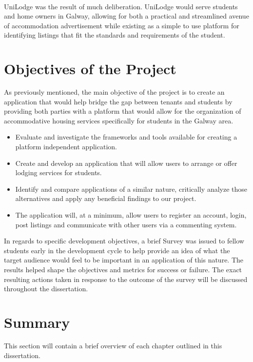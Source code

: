 \paragraph{}
UniLodge was the result of much deliberation. UniLodge would serve students and home owners in Galway, allowing for both a practical and streamlined avenue of accommodation advertisement while existing as a simple to use platform for identifying listings that fit the standards and requirements of the student. 

\section{Objectives of the Project}
As previously mentioned, the main objective of the project is to create an application that would help bridge the gap between tenants and students by providing both parties with a platform that would allow for the organization of accommodative housing services specifically for students in the Galway area.

\begin{itemize}
    \item Evaluate and investigate the frameworks and tools available for creating a platform independent application.
    \item Create and develop an application that will allow users to arrange or offer lodging services for students.
    \item Identify and compare applications of a similar nature, critically analyze those alternatives and apply any beneficial findings to our project.
    \item The application will, at a minimum, allow users to register an account, login, post listings and communicate with other users via a commenting system.
\end{itemize}

In regards to specific development objectives, a brief Survey \cite{SURVEY} was issued to fellow students early in the development cycle to help provide an idea of what the target audience would feel to be important in an application of this nature. The results helped shape the objectives and metrics for success or failure. The exact resulting actions taken in response to the outcome of the survey will be discussed throughout the dissertation.

\section{Summary}
This section will contain a brief overview of each chapter outlined in this dissertation.
